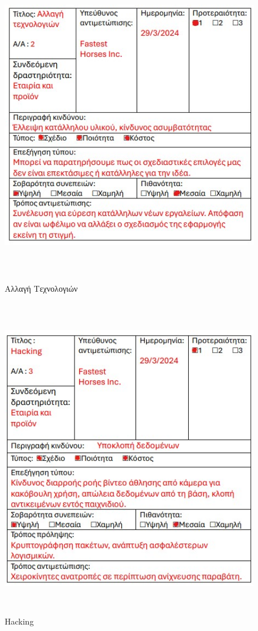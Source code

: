 \begin{figure}[!htb]
  \centering
    \centering
    \includegraphics[width=\textwidth,height=14cm]{risk2.jpg}
    \caption{Αλλαγή Τεχνολογιών}
    \label{}
\end{figure}
\begin{figure}[!htb]
  \centering
    \centering
    \includegraphics[width=\textwidth,height=14cm]{risk3.jpg}
    \caption{Hacking}
    \label{}
\end{figure}
